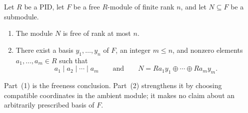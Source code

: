 \begin{theorem}
\label{thm:pid-submodules-compatible-bases}
Let \(R\) be a PID, let \(F\) be a free \(R\)-module of finite rank \(n\),
and let \(N\subseteq F\) be a submodule.
\begin{enumerate}
\item The module \(N\) is free of rank at most \(n\).
\item There exist a basis \(y_1,\ldots,y_n\) of \(F\), an integer
      \(m\leq n\), and nonzero elements \(a_1,\ldots,a_m\in R\) such that
\[
a_1\mid a_2\mid\cdots\mid a_m
\qquad\text{and}\qquad
N=Ra_1y_1\oplus\cdots\oplus Ra_my_m.
\]
\end{enumerate}
Part~(1) is the freeness conclusion. Part~(2) strengthens it by choosing
compatible coordinates in the ambient module; it makes no claim about an
arbitrarily prescribed basis of \(F\).
\end{theorem}
